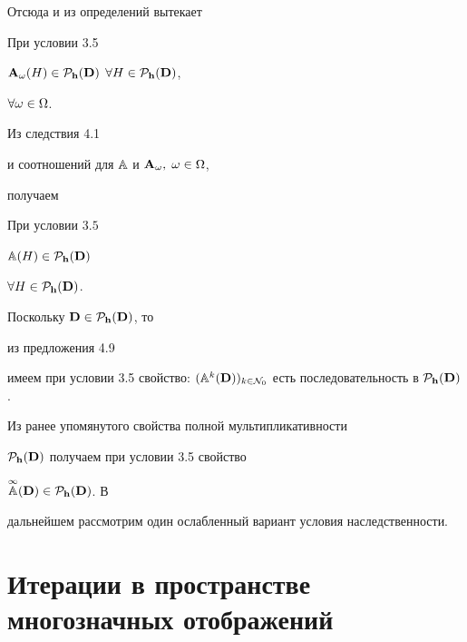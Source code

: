 Отсюда и из определений вытекает





\begin{cors}


При условии 3.5


${{\bold A}_\omega}(H) \in {{\cal P}_{\bold h}}({\bold


D})$ $\fo{H} \in {{\cal P}_{\bold h}}({\bold D})$,


$\forall{\omega} \in \Omega$.


\end{cors}





Из следствия 4.1


и соотношений для ${\Bbb A}$ и ${{\bold A}_\omega},\;\omega \in \Omega$,


получаем





\begin{props}


При условии $3.5$


${\Bbb A}(H) \in {{\cal P}_{\bold h}}({\bold D})$\;


$\forall{H} \in {{\cal P}_{\bold h}}({\bold D})$.


\end{props}





Поскольку ${\bold D} \in {{\cal P}_{\bold h}}({\bold D})$, то


из предложения 4.9


имеем при условии 3.5 свойство: $({{\Bbb A}^k}({\bold D}))_{k \in


{{\cal N}_0}}$ есть последовательность в ${{\cal P}_{\bold h}}({\bold D})$.


Из ранее упомянутого свойства полной мультипликативности


${{\cal P}_{\bold h}}({\bold D})$ получаем при условии 3.5 свойство


$\overset{\infty}{\Bbb A}{}({\bold D}) \in {{\cal P}_{\bold h}}({\bold D})$. В


дальнейшем рассмотрим один ослабленный вариант условия наследственности.





\section{Итерации в пространстве многозначных отображений}





